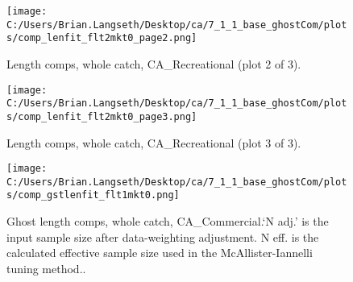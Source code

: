 \documentclass[11pt,
  english,
  a4paper,
]{article}
\begin{document}
\tagmcend\tagstructend


\begin{figure}
\centering
\texttt{[image: C:/Users/Brian.Langseth/Desktop/ca/7\_1\_1\_base\_ghostCom/plots/comp\_lenfit\_flt2mkt0\_page2.png]}
\caption{Length comps, whole catch, CA\_Recreational (plot 2 of 3).\label{fig:comp_lenfit_flt2mkt0_page2}}
\end{figure}

\tagmcend\tagstructend


\begin{figure}
\centering
\texttt{[image: C:/Users/Brian.Langseth/Desktop/ca/7\_1\_1\_base\_ghostCom/plots/comp\_lenfit\_flt2mkt0\_page3.png]}
\caption{Length comps, whole catch, CA\_Recreational (plot 3 of 3).\label{fig:comp_lenfit_flt2mkt0_page3}}
\end{figure}

\tagmcend\tagstructend


\begin{figure}
\centering
\texttt{[image: C:/Users/Brian.Langseth/Desktop/ca/7\_1\_1\_base\_ghostCom/plots/comp\_gstlenfit\_flt1mkt0.png]}
\caption{Ghost length comps, whole catch, CA\_Commercial.`N adj.' is the input sample size after data-weighting adjustment. N eff. is the calculated effective sample size used in the McAllister-Iannelli tuning method..\label{fig:comp_gstlenfit_flt1mkt0}}
\end{figure}

\tagmcend\tagstructend

\clearpage
\end{document}
